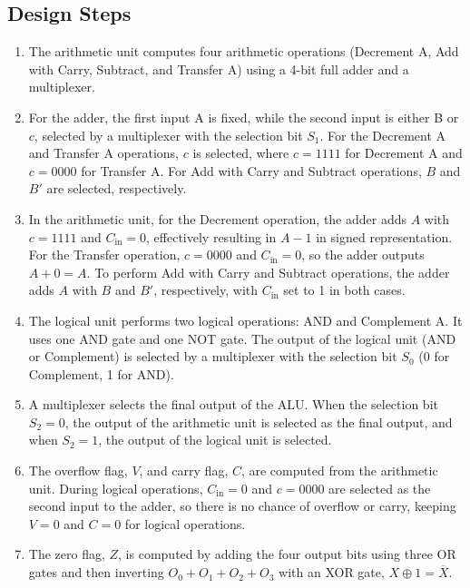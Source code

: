 \documentclass{article}
\begin{document}
    \subsection{Design Steps}
        \begin{enumerate}
            \item The arithmetic unit computes four arithmetic operations (Decrement A, Add with Carry, Subtract, and Transfer A) using a 4-bit full adder and a multiplexer.
            \item For the adder, the first input A is fixed, while the second input is either B or \( c \), selected by a multiplexer with the selection bit \( S_1 \). For the Decrement A and Transfer A operations, \( c \) is selected, where \( c = 1111 \) for Decrement A and \( c = 0000 \) for Transfer A. For Add with Carry and Subtract operations, \( B \) and \( B' \) are selected, respectively.
            \item In the arithmetic unit, for the Decrement operation, the adder adds \( A \) with \( c = 1111 \) and \( C_{\text{in}} = 0 \), effectively resulting in \( A - 1 \) in signed representation. For the Transfer operation, \( c = 0000 \) and \( C_{\text{in}} = 0 \), so the adder outputs \( A + 0 = A \). To perform Add with Carry and Subtract operations, the adder adds \( A \) with \( B \) and \( B' \), respectively, with \( C_{\text{in}} \) set to 1 in both cases.
            \item The logical unit performs two logical operations: AND and Complement A. It uses one AND gate and one NOT gate. The output of the logical unit (AND or Complement) is selected by a multiplexer with the selection bit \( S_0 \) (0 for Complement, 1 for AND).
            \item A multiplexer selects the final output of the ALU. When the selection bit \( S_2 = 0 \), the output of the arithmetic unit is selected as the final output, and when \( S_2 = 1 \), the output of the logical unit is selected.
            \item The overflow flag, \( V \), and carry flag, \( C \), are computed from the arithmetic unit. During logical operations, \( C_{\text{in}} = 0 \) and \( c = 0000 \) are selected as the second input to the adder, so there is no chance of overflow or carry, keeping \( V = 0 \) and \( C = 0 \) for logical operations.
            \item The zero flag, \( Z \), is computed by adding the four output bits using three OR gates and then inverting \( O_0 + O_1 + O_2 + O_3 \) with an XOR gate, \( X \oplus 1 = \overline{X} \).
        \end{enumerate}
\end{document}
